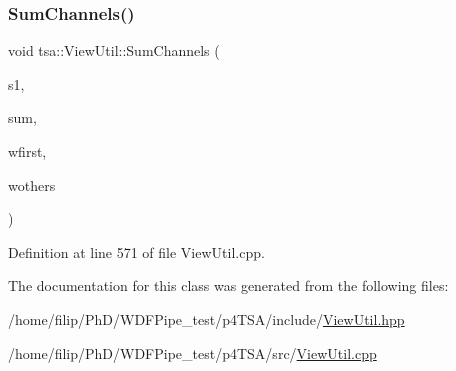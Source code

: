 \subsubsection{\texorpdfstring{Sum\+Channels()}{SumChannels()}\hspace{0.1cm}{\footnotesize\ttfamily [2/2]}}
{\footnotesize\ttfamily void tsa\+::\+View\+Util\+::\+Sum\+Channels (\begin{DoxyParamCaption}\item[{\hyperlink{namespacetsa_ac599574bcc094eda25613724b8f3ca9e}{Seq\+View\+Double} \&}]{s1,  }\item[{\hyperlink{namespacetsa_ac599574bcc094eda25613724b8f3ca9e}{Seq\+View\+Double} \&}]{sum,  }\item[{double}]{wfirst,  }\item[{double}]{wothers }\end{DoxyParamCaption})\hspace{0.3cm}{\ttfamily [static]}}



Definition at line 571 of file View\+Util.\+cpp.



The documentation for this class was generated from the following files\+:\begin{DoxyCompactItemize}
\item 
/home/filip/\+Ph\+D/\+W\+D\+F\+Pipe\+\_\+test/p4\+T\+S\+A/include/\hyperlink{_view_util_8hpp}{View\+Util.\+hpp}\item 
/home/filip/\+Ph\+D/\+W\+D\+F\+Pipe\+\_\+test/p4\+T\+S\+A/src/\hyperlink{_view_util_8cpp}{View\+Util.\+cpp}\end{DoxyCompactItemize}
